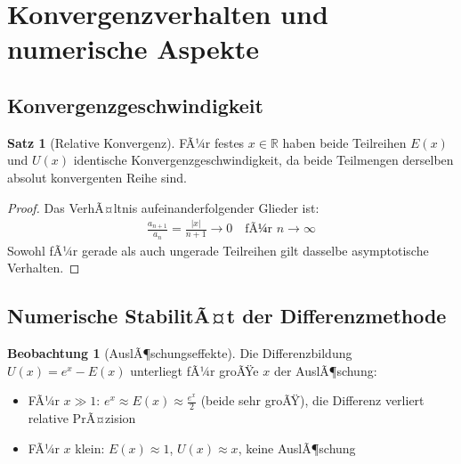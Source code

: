 ﻿\documentclass[a4paper,12pt]{article}
\theoremstyle{definition}
\newtheorem{satz}{Satz}
\newtheorem{beobachtung}{Beobachtung}
\begin{document}
\section{Konvergenzverhalten und numerische Aspekte}

\subsection{Konvergenzgeschwindigkeit}

\begin{satz}[Relative Konvergenz]
FÃ¼r festes $x \in \mathbb{R}$ haben beide Teilreihen $E(x)$ und $U(x)$
identische Konvergenzgeschwindigkeit, da beide Teilmengen derselben absolut
konvergenten Reihe sind.
\end{satz}

\begin{proof}
Das VerhÃ¤ltnis aufeinanderfolgender Glieder ist:
\begin{align}
  \frac{a_{n+1}}{a_n} = \frac{|x|}{n+1} \to 0 \quad \text{fÃ¼r } n \to \infty
\end{align}
Sowohl fÃ¼r gerade als auch ungerade Teilreihen gilt dasselbe asymptotische
Verhalten.
\end{proof}

\subsection{Numerische StabilitÃ¤t der Differenzmethode}

\begin{beobachtung}[AuslÃ¶schungseffekte]
Die Differenzbildung $U(x) = e^x - E(x)$ unterliegt fÃ¼r groÃŸe $x$ der
AuslÃ¶schung:
\begin{itemize}
  \item[-] FÃ¼r $x \gg 1$: $e^x \approx E(x) \approx \frac{e^x}{2}$
           (beide sehr groÃŸ), die Differenz verliert relative PrÃ¤zision
  \item[-] FÃ¼r $x$ klein: $E(x) \approx 1$, $U(x) \approx x$,
           keine AuslÃ¶schung
\end{itemize}
\end{beobachtung}
\end{document}
